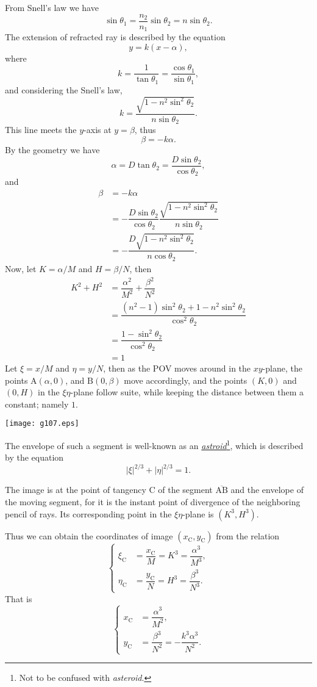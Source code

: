 \documentclass[twocolumn]{article}
\begin{document}
From Snell's law we have
$$ \sin\theta_1 = \frac{n_2}{n_1} \sin\theta_2 = n\sin\theta_2.$$
The extension of refracted ray is described by the equation 
$$y=k(x-\alpha),$$
where 
$$k=\dfrac{1}{\tan\theta_1}=\dfrac{\cos\theta_1}{\sin\theta_1},$$
and considering the Snell's law,
$$k=\dfrac{\sqrt{1-n^2\sin^2\theta_2}}{n\sin\theta_2}.$$
This line meets the $y$-axis at $y=\beta$, thus
$$\beta = -k\alpha.$$
By the geometry we have
$$\alpha = D\tan\theta_2 = \dfrac{D\sin\theta_2}{\cos\theta_2},$$
and
$$\begin{aligned}
	\beta &= -k\alpha \\
	&= -\dfrac{D\sin\theta_2}{\cos\theta_2}
	\dfrac{\sqrt{1-n^2\sin^2\theta_2}}{n\sin\theta_2}\\
	&=-\dfrac{D\sqrt{1-n^2\sin^2\theta_2}}{n\cos\theta_2}.
\end{aligned}$$
Now, let $K=\alpha/M$ and $H=\beta/N$, then
$$ \begin{aligned}
	K^2 + H^2 &= \dfrac{\alpha^2}{M^2}+\dfrac{\beta^2}{N^2}\\
	&=\dfrac{\left(n^2-1\right)\sin^2\theta_2 + 1-n^2\sin^2\theta_2}
	{\cos^2\theta_2}\\
	&=\dfrac{1-\sin^2\theta_2}{\cos^2\theta_2}\\
	&=1
\end{aligned}$$
Let $\xi=x/M$ and $\eta=y/N$, then as the POV moves around in the $xy$-plane,
the points $\mathrm{A}(\alpha, 0)$, and $\mathrm{B}(0, \beta)$ move accordingly,  
and the points $(K, 0)$ and $(0, H)$ in the $\xi\eta$-plane follow suite, 
while keeping the distance between them a constant; namely $1$.

\texttt{[image: g107.eps]}

The envelope of such a segment is well-known as an \href{https://en.wikipedia.org/wiki/Astroid}{\emph{astroid}}\footnote{Not 
to be confused with {\emph{asteroid}}.}, which is described by the 
equation
$$ \left| \xi \right|^{2/3} + \left| \eta \right|^{2/3} = 1. $$

The image is at the point of tangency $\mathrm{C}$ of the segment 
$\overline{\mathrm{AB}}$ and the envelope of the moving segment, for 
it is the instant point of divergence of the neighboring pencil of rays.
Its corresponding point in the $\xi\eta$-plane is $(K^3, H^3)$.

Thus we can obtain the coordinates of image $(x_{\mathrm{C}}^{}, y_{\mathrm{C}}^{})$ 
from the relation
$$ \left\{ 
\begin{aligned}
	\xi_{\mathrm{C}}^{} &= \dfrac{x_{\mathrm{C}}^{}}{M} = K^3 = \dfrac{\alpha^3}{M^3},\\
	\eta_{\mathrm{C}}^{} &= \dfrac{y_{\mathrm{C}}^{}}{N} = H^3 = \dfrac{\beta^3}{N^3}.
\end{aligned}
\right.$$
That is
$$ \left\{ 
\begin{aligned}
	x_{\mathrm{C}}^{} &= \dfrac{\alpha^3}{M^2},\\
	y_{\mathrm{C}}^{} &= \dfrac{\beta^3}{N^2}=-\dfrac{k^3\alpha^3}{N^2}.
\end{aligned}
\right.$$
\end{document}

